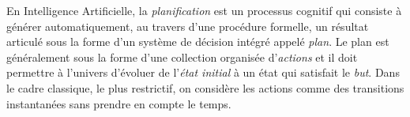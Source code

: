 
En Intelligence Artificielle, la \emph{planification} est un processus cognitif qui consiste \`a g\'en\'erer automatiquement, au travers d'une proc\'edure formelle, un r\'esultat articul\'e sous la forme d'un syst\`eme de d\'ecision int\'egr\'e appel\'e \emph{plan}. Le plan est g\'en\'eralement sous la forme d'une collection organis\'ee d'\emph{actions} et il doit permettre \`a l'univers d'\'evoluer de l'\emph{\'etat initial} \`a un \'etat qui satisfait le \emph{but}. Dans le cadre classique, le plus restrictif, on consid\`{e}re les actions comme des transitions instantan\'{e}es sans prendre en compte le temps.




